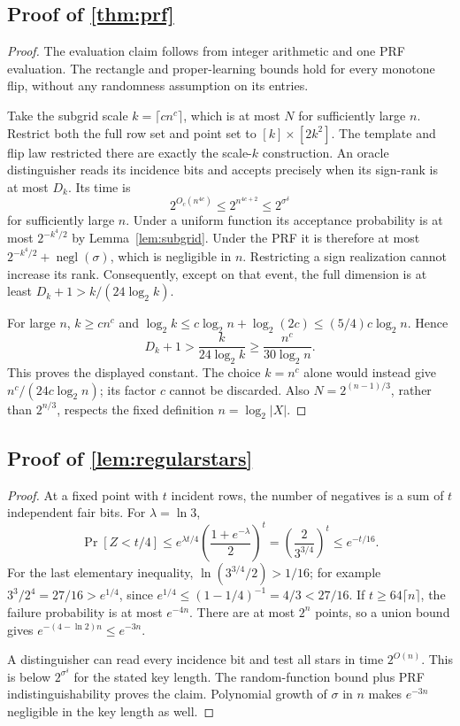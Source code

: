\subsection[Proof of result prf]{Proof of \cref{thm:prf}}\label{proof:prf}
\begin{proof}
The evaluation claim follows from integer arithmetic and one PRF evaluation. The rectangle and proper-learning bounds hold for every monotone flip, without any randomness assumption on its entries.

Take the subgrid scale $k=\lceil c n^c\rceil$, which is at most $N$ for sufficiently large $n$. Restrict both the full row set and point set to $[k]\times[2k^2]$. The template and flip law restricted there are exactly the scale-$k$ construction. An oracle distinguisher reads its incidence bits and accepts precisely when its sign-rank is at most $D_k$. Its time is
\[
 2^{O_c(n^{4c})}\le2^{n^{4c+2}}\le2^{\sigma^\delta}
\]
for sufficiently large $n$. Under a uniform function its acceptance probability is at most $2^{-k^4/2}$ by Lemma~\ref{lem:subgrid}. Under the PRF it is therefore at most $2^{-k^4/2}+\operatorname{negl}(\sigma)$, which is negligible in $n$. Restricting a sign realization cannot increase its rank. Consequently, except on that event, the full dimension is at least $D_k+1>k/(24\log_2k)$.

For large $n$, $k\ge c n^c$ and $\log_2k\le c\log_2n+\log_2(2c)\le(5/4)c\log_2n$. Hence
\[
 D_k+1>\frac{k}{24\log_2k}\ge\frac{n^c}{30\log_2n}.
\]
This proves the displayed constant. The choice $k=n^c$ alone would instead give $n^c/(24c\log_2n)$; its factor $c$ cannot be discarded. Also $N=2^{(n-1)/3}$, rather than $2^{n/3}$, respects the fixed definition $n=\log_2|X|$.
\end{proof}

\subsection[Proof of result regularstars]{Proof of \cref{lem:regularstars}}\label{proof:regularstars}
\begin{proof}
At a fixed point with $t$ incident rows, the number of negatives is a sum of $t$ independent fair bits. For $\lambda=\ln3$,
\[
 \Pr[Z<t/4]\le e^{\lambda t/4}\left(\frac{1+e^{-\lambda}}2\right)^t
 =\left(\frac{2}{3^{3/4}}\right)^t\le e^{-t/16}.
\]
For the last elementary inequality, $\ln(3^{3/4}/2)>1/16$; for example $3^3/2^4=27/16>e^{1/4}$, since $e^{1/4}\le(1-1/4)^{-1}=4/3<27/16$. If $t\ge64\lceil n\rceil$, the failure probability is at most $e^{-4n}$. There are at most $2^n$ points, so a union bound gives $e^{-(4-\ln2)n}\le e^{-3n}$.

A distinguisher can read every incidence bit and test all stars in time $2^{O(n)}$. This is below $2^{\sigma^\delta}$ for the stated key length. The random-function bound plus PRF indistinguishability proves the claim. Polynomial growth of $\sigma$ in $n$ makes $e^{-3n}$ negligible in the key length as well.
\end{proof}


